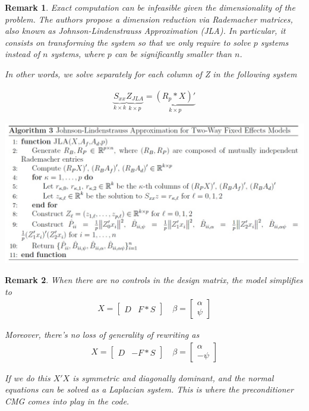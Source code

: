 \documentclass[12pt]{article}
\newtheorem{remark}{Remark}
\begin{document}
\begin{remark}
Exact computation can be infeasible given the dimensionality of the problem. The authors propose a dimension reduction via Rademacher matrices, also known as Johnson-Lindenstrauss Approximation (JLA). In particular, it consists on transforming the system so that we only require to solve $p$ systems instead of $n$ systems, where $p$ can be significantly smaller than $n$.

In other words, we solve separately for each column of Z in the following system

\begin{align*}
    \underbrace{S_{xx}}_{k\times k} \underbrace{Z_{JLA}}_{k\times p}  = \underbrace{(R_p *X)'}_{k\times p}
\end{align*}


\end{remark}

\includegraphics[scale=0.7]{JLA_algorithm.jpg}

\begin{remark}
When there are no controls in the design matrix, the model simplifies to
\begin{align*}
    X = \begin{bmatrix} D & F*S \end{bmatrix} \quad \beta = \begin{bmatrix} \alpha \\ \psi \end{bmatrix} 
\end{align*}

\noindent Moreover, there's no loss of generality of rewriting as
\begin{align*}
    X = \begin{bmatrix} D & -F*S \end{bmatrix} \quad \beta = \begin{bmatrix} \alpha \\ -\psi \end{bmatrix} 
\end{align*}

\noindent If we do this $X'X$ is symmetric and diagonally dominant, and the normal equations can be solved as a Laplacian system. This is where the preconditioner \textit{CMG} comes into play in the code.


\end{remark}
\end{document}
